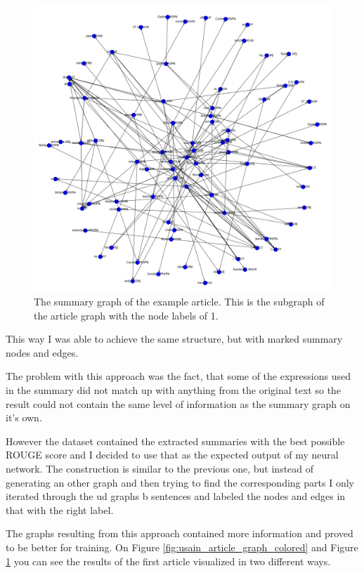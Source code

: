 \begin{figure}[!ht]
	\centering
	\includegraphics[width=150mm, keepaspectratio]{figures/usain_bolt_summary.png}
	\caption{The summary graph of the example article. This is the subgraph of the article graph with the node labels of 1.}
	\label{fig:usain_summary_graph}
\end{figure}

This way I was able to achieve the same structure, but with marked summary nodes and edges.

The problem with this approach was the fact, that some of the expressions used in the summary did not match up with anything from the original text so the result could not contain the same level of information as the summary graph on it's own.

However the dataset contained the extracted summaries with the best possible ROUGE score and I decided to use that as the expected output of my neural network. The construction is similar to the previous one, but instead of generating an other graph and then trying to find the corresponding parts I only iterated through the ud graphs b sentences and labeled the nodes and edges in that with the right label.

The graphs resulting from this approach contained more information and proved to be better for training. On Figure \ref{fig:usain_article_graph_colored} and Figure \ref{fig:usain_summary_graph} you can see the results of the first article visualized in two different ways.
